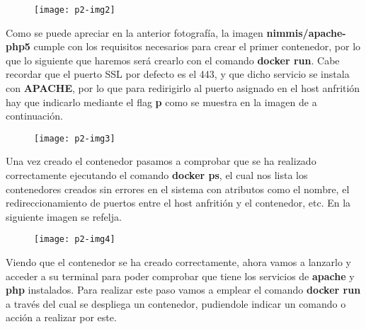 \documentclass[10pt]{article}
\begin{document}
\begin{figure}[H]
	\begin{center}
 		\texttt{[image: p2-img2]}
	\end{center} 
\end{figure}

Como se puede apreciar en la anterior fotografía, la imagen \textbf{nimmis/apache-php5} cumple con los requisitos necesarios para crear el primer contenedor, por lo que lo siguiente que haremos será crearlo con el comando \textbf{docker run}. Cabe recordar que el puerto SSL por defecto es el 443, y que dicho servicio se instala con  \textbf{APACHE}, por lo que para redirigirlo al puerto asignado en el host anfritión hay que indicarlo mediante el flag \textbf{p} como se muestra en la imagen de a continuación. \\

\begin{figure}[H]
	\begin{center}
 		\texttt{[image: p2-img3]}
	\end{center} 
\end{figure}

Una vez creado el contenedor pasamos a comprobar que se ha realizado correctamente ejecutando el comando \textbf{docker ps}, el cual nos lista los contenedores creados sin errores en el sistema con atributos como el nombre, el redireccionamiento de puertos entre el host anfritión y el contenedor, etc. En la siguiente imagen se refelja.\\

\begin{figure}[H]
	\begin{center}
 		\texttt{[image: p2-img4]}
	\end{center} 
\end{figure}

Viendo que el contenedor se ha creado correctamente, ahora vamos a lanzarlo y acceder a su terminal para poder comprobar que tiene los servicios de \textbf{apache} y \textbf{php} instalados. Para realizar este paso vamos a emplear el comando \textbf{docker run} a través del cual se despliega un contenedor, pudiendole indicar un comando o acción a realizar por este. \\
\end{document}
